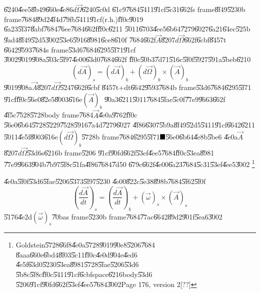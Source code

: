 \documentclass[12pt]{article}
\begin{document}
\U{6240}\U{4ee5}\U{8b49}\U{660e}\U{4e86}$d\vec{\Omega}$\U{6240}\U{5c0d}%
\U{61c9}\U{7684}\U{5411}\U{91cf}\U{5c31}\U{662f}s frame\U{8f49}\U{5230}b
frame\U{7684}\U{89d2}\U{4f4d}\U{79fb}\U{5411}\U{91cf}(r.h.)\U{ff0c}\U{9019}%
\U{6a23}\U{5f37}\U{8abf}\U{7684}\U{76ee}\U{7684}\U{662f}\U{ff0c}\U{6211}%
\U{5011}\U{6703}\U{4ee5}\U{6b64}\U{7279}\U{6027}\U{6a21}\U{64ec}\U{525b}%
\U{9ad4}\U{8f49}\U{52d5}\U{3002}\U{53e6}\U{5916}\U{8981}\U{6ce8}\U{610f}%
\U{7684}\U{662f}$\vec{A}$\U{8207}$d\vec{\Omega}$\U{662f}\U{6cbf}\U{8457}t%
\U{6642}\U{9593}\U{7684}s frame\U{53d6}\U{7684}\U{6295}\U{5f71}\U{91cf}%
\U{3002}\U{9019}\U{908a}\U{503c}\U{5f97}\U{4e00}\U{63d0}\U{7684}\U{662f}%
\U{ff0c}\U{50b3}\U{7d71}\U{516c}\U{5f0f}\U{5927}\U{591a}\U{5beb}\U{6210}%
\begin{equation*}
\left( d\vec{A}\right) _{s}=\left( d\vec{A}\right) _{b}+\left( d\vec{\Omega}%
\right) _{b}\times \left( \vec{A}\right) _{b}
\end{equation*}%
\U{9019}\U{908a}$\vec{A}$\U{8207}$d\vec{\Omega}$\U{5247}\U{662f}\U{6cbf}%
\U{8457}t+dt\U{6642}\U{9593}\U{7684}b frame\U{53d6}\U{7684}\U{6295}\U{5f71}%
\U{91cf}\U{ff0c}\U{56e0}\U{82e5}\U{8003}\U{616e}$\left( \vec{A}\right) _{b}$%
\U{90a3}\U{6211}\U{5011}\U{7684}\U{5fae}\U{5c0f}\U{77e9}\U{9663}\U{662f}%
\U{4f5c}\U{7528}\U{5728}body frame\U{7684}$\vec{A}$\U{4e0a}\U{9762}\U{ff0c}%
\U{56e0}\U{6b64}\U{5728}\U{5229}\U{7528}\U{5916}\U{7a4d}\U{7279}\U{6027}%
\U{4f86}\U{6307}\U{5b9a}\U{8f49}\U{52d5}\U{5411}\U{91cf}\U{6642}\U{6211}%
\U{5011}\U{4e5f}\U{8003}\U{616e}$\left( d\vec{\Omega}\right) _{b}$\U{5728}b
frame\U{7684}\U{6295}\U{5f71}$\U{ff0c} $\U{56e0}\U{6b64}\U{4e8b}\U{5be6}%
\U{4e0a}$\vec{A}$\U{8207}$d\vec{\Omega}$\U{53d6}s\U{6216}b frame\U{5206}%
\U{91cf}\U{90fd}\U{662f}\U{53ef}\U{4ee5}\U{7684}\U{ff0c}\U{53ea}\U{8981}%
\U{77e9}\U{9663}\U{904b}\U{7b97}\U{5f8c}\U{51fa}\U{4f86}\U{7684}\U{7d50}%
\U{679c}\U{662f}\U{4e00}\U{6a23}\U{7684}\U{5c31}\U{53ef}\U{4ee5}\U{3002}%
\footnote{%
Goldstein\U{5728}\U{66f8}\U{4e0a}\U{5728}\U{9019}\U{90e8}\U{5206}\U{7684}%
\U{8aaa}\U{660e}\U{6bd4}\U{8f03}\U{5c11}\U{ff0c}\U{4e0d}\U{904e}\U{4ed6}%
\U{4e5f}\U{63d0}\U{5230}\U{53ea}\U{8981}\U{5728}\U{5fae}\U{5206}\U{53d6}%
\U{5b8c}\U{5f8c}\U{ff0c}\U{5411}\U{91cf}\U{6cbf}space\U{6216}body\U{53d6}%
\U{5206}\U{91cf}\U{90fd}\U{662f}\U{53ef}\U{4ee5}\U{7684}\U{3002}Page 176,
version 2[??]}

\bigskip \U{4e0a}\U{5f0f}\U{53d6}\U{5fae}\U{5206}\U{5373}\U{5f97}\U{5230}%
\U{4e00}\U{822c}\U{5e38}\U{898b}\U{7684}\U{5f62}\U{5f0f}%
\begin{equation}
\left( \frac{d\vec{A}}{dt}\right) _{s}=\left( \frac{d\vec{A}}{dt}\right)
_{b}+\left( \vec{\omega}\right) _{s}\times \left( \vec{A}\right) _{s}
\label{rateofchange}
\end{equation}%
\U{5176}\U{4e2d}$\left( \vec{\omega}\right) _{s}$\U{70ba}s frame\U{5230}b
frame\U{7684}\U{77ac}\U{6642}\U{89d2}\U{901f}\U{5ea6}\U{3002}
\end{document}
